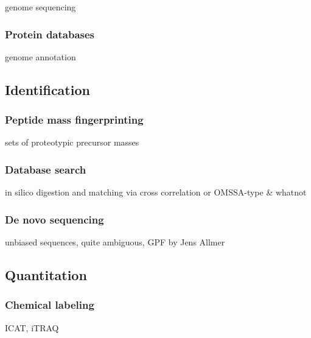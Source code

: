 \documentclass[11pt,a4paper,twoside]{report}
\begin{document}
\begin{todo}
genome sequencing
\end{todo}

\subsubsection{Protein databases}

\begin{todo}
genome annotation
\end{todo}

\subsection{Identification}

\subsubsection{Peptide mass fingerprinting}

\begin{todo}
sets of proteotypic precursor masses
\end{todo}

\subsubsection{Database search}

\begin{todo}
in silico digestion and matching via cross correlation or OMSSA-type & whatnot
\end{todo}

\subsubsection{De novo sequencing}

\begin{todo}
unbiased sequences, quite ambiguous, GPF by Jens Allmer
\end{todo}

\subsection{Quantitation}

\subsubsection{Chemical labeling}
 
\begin{todo}
ICAT, iTRAQ
\end{todo}
\end{document}
